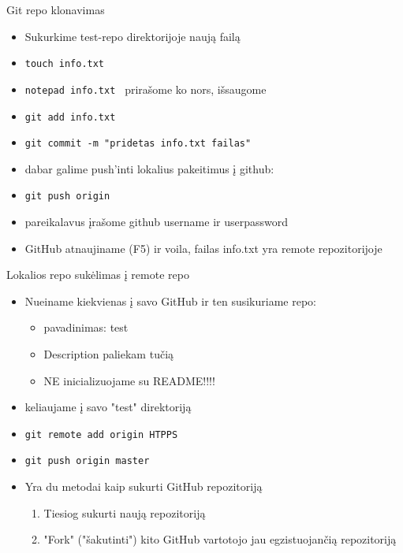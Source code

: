 \documentclass[11pt,xcolor=table]{beamer}
\begin{document}

\begin{frame}{Git repo klonavimas}
\begin{itemize}
\item Sukurkime test-repo direktorijoje naują failą
\item \colorbox{listinggray}{\lstinline|touch info.txt|}
\item \colorbox{listinggray}{\lstinline|notepad info.txt |} prirašome ko nors, išsaugome
\item \colorbox{listinggray}{\lstinline|git add info.txt|}
\item \colorbox{listinggray}{\lstinline|git commit -m "pridetas info.txt failas"|}
\item dabar galime push'inti lokalius pakeitimus į github:
\item \colorbox{listinggray}{\lstinline|git push origin |}
\item pareikalavus įrašome github username ir userpassword
\item GitHub atnaujiname (F5) ir voila, failas info.txt yra remote repozitorijoje
\end{itemize}
\end{frame}


\begin{frame}{Lokalios repo sukėlimas į remote repo}
\begin{itemize}
\item Nueiname kiekvienas į savo GitHub ir ten susikuriame repo:
\begin{itemize}
\item pavadinimas: test
\item Description paliekam tučią
\item NE inicializuojame su README!!!!
\end{itemize}
\item keliaujame į savo "test" direktoriją
\item \colorbox{listinggray}{\lstinline|git remote add origin HTPPS|}
\item \colorbox{listinggray}{\lstinline|git push origin master|}
\end{itemize}
\end{frame}


\begin{frame}
\begin{itemize}
\item Yra du metodai kaip sukurti GitHub repozitoriją
\begin{enumerate}
\item Tiesiog sukurti naują repozitoriją
\item "Fork" ("šakutinti") kito GitHub vartotojo jau egzistuojančią repozitoriją
\end{enumerate}
\end{itemize}
\end{frame}
\end{document}
